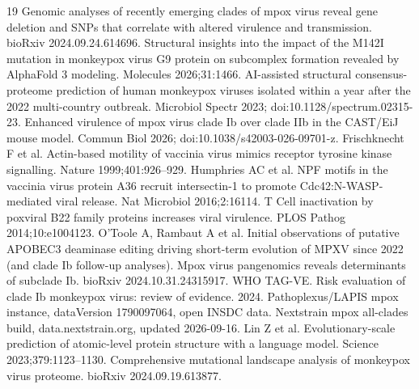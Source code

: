 \documentclass[11pt]{article}
\begin{document}
\begin{thebibliography}{19}
 Genomic analyses of recently emerging clades of mpox virus reveal gene deletion and
SNPs that correlate with altered virulence and transmission. bioRxiv 2024.09.24.614696.
 Structural insights into the impact of the M142I mutation in monkeypox virus G9
protein on subcomplex formation revealed by AlphaFold 3 modeling. Molecules 2026;31:1466.
 AI-assisted structural consensus-proteome prediction of human monkeypox viruses
isolated within a year after the 2022 multi-country outbreak. Microbiol Spectr 2023;
doi:10.1128/spectrum.02315-23.
 Enhanced virulence of mpox virus clade Ib over clade IIb in the CAST/EiJ mouse
model. Commun Biol 2026; doi:10.1038/s42003-026-09701-z.
 Frischknecht F et al. Actin-based motility of vaccinia virus mimics receptor
tyrosine kinase signalling. Nature 1999;401:926--929.
 Humphries AC et al. NPF motifs in the vaccinia virus protein A36 recruit
intersectin-1 to promote Cdc42:N-WASP-mediated viral release. Nat Microbiol 2016;2:16114.
 T Cell inactivation by poxviral B22 family proteins increases viral virulence.
PLOS Pathog 2014;10:e1004123.
 O'Toole A, Rambaut A et al. Initial observations of putative APOBEC3 deaminase
editing driving short-term evolution of MPXV since 2022 (and clade Ib follow-up analyses).
 Mpox virus pangenomics reveals determinants of subclade Ib. bioRxiv
2024.10.31.24315917.
 WHO TAG-VE. Risk evaluation of clade Ib monkeypox virus: review of evidence. 2024.
 Pathoplexus/LAPIS mpox instance, dataVersion 1790097064, open INSDC data.
 Nextstrain mpox all-clades build, data.nextstrain.org, updated 2026-09-16.
 Lin Z et al. Evolutionary-scale prediction of atomic-level protein structure with
a language model. Science 2023;379:1123--1130.
 Comprehensive mutational landscape analysis of monkeypox virus proteome. bioRxiv
2024.09.19.613877.
\end{thebibliography}

\clearpage
\end{document}
